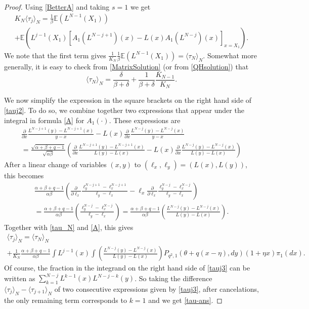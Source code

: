 \documentclass{amsart}
\theoremstyle{definition}
\theoremstyle{remark}
\theoremstyle{remark}
\theoremstyle{definition}
\numberwithin{equation}{section}
\begin{document}
\begin{proof}
Using \eqref{BetterA} and taking $s=1$ we get
\begin{multline}\label{tauj2}
  K_N\langle \tau_j\rangle_N =\frac{1}{\beta}{\mathds{E}} \left(L^{N-1}(X_1)\right) \\ +{\mathds{E}}\left(L^{j-1}(X_1)\left[A_1(L^{N-j+1})(x)-L(x)A_1(L^{N-j})(x)\right]_{x=X_1}\right).
\end{multline}
We note that the first term gives
$\tfrac{1}{K_N}\frac{1}{\beta}{\mathds{E}} \left(L^{N-1}(X_1)\right)={\langle}\tau_N{\rangle}_N$. Somewhat more generally, it is easy to check from \eqref{MatrixSolution} (or from \eqref{QHsolution}) that
\begin{equation}
  \label{tau_N}
   \langle \tau_N\rangle_N=\frac{\delta}{\beta+\delta}+\frac{1}{\beta+\delta}\frac{K_{N-1}}{K_N}.
\end{equation}

We now simplify the expression in the square brackets on the right hand side of \eqref{tauj2}. To do so, we  combine together  two expressions that appear  under the integral in  formula \eqref{A} for $A_1(\cdot)$. These expressions are
\begin{multline*}
\frac{\partial}{\partial x}\frac{L^{N-j+1}(y)-L^{N-j+1}(x)}{y-x}-L(x)\frac{\partial}{\partial x}\frac{L^{N-j}(y)-L^{N-j}(x)}{y-x}
\\
=\frac{\sqrt{\alpha+\beta+q-1}}{\sqrt{\alpha\beta}}
\left(\frac{\partial}{\partial x}\frac{L^{N-j+1}(y)-L^{N-j+1}(x)}{L(y)-L(x)}-
L(x)\frac{\partial}{\partial x}\frac{L^{N-j}(y)-L^{N-j}(x)}{L(y)-L(x)}\right)
\end{multline*}
After a linear change of variables $(x,y)$ to $(\ell_x,\ell_y)=(L(x),L(y))$, this becomes
\begin{multline*}
\frac{ \alpha+\beta+q-1}{ \alpha\beta}
\left(\frac{\partial}{\partial \ell_x}\frac{\ell_y^{N-j+1}-\ell_x^{N-j+1}}{\ell_y-\ell_x}-
\ell_x\frac{\partial}{\partial \ell_x}\frac{\ell_y^{N-j}-\ell_x^{N-j}}{\ell_y-\ell_x}\right) \\
=\frac{ \alpha+\beta+q-1}{ \alpha\beta}
\left(\frac{\ell_y^{N-j}-\ell_x^{N-j}}{\ell_y-\ell_x}\right)= \frac{ \alpha+\beta+q-1}{ \alpha\beta}
\left(\frac{L^{N-j}(y)-L^{N-j}(x)}{L(y)-L(x)}
\right).
\end{multline*}
Together with \eqref{tau_N} and \eqref{A}, this gives
\begin{multline}
  \label{tauj3}
   \langle \tau_j\rangle_N= \langle \tau_N\rangle_N \\ +
   \frac{1}{K_N}  \frac{ \alpha+\beta+q-1}{ \alpha\beta}\int L^{j-1}(x)\int \left(\frac{L^{N-j}(y)-L^{N-j}(x)}{L(y)-L(x)}
\right) P_{q^2,1}(\theta+q(x-\eta),dy) (1+\eta x)\pi_1(dx).
\end{multline}
Of course, the fraction in the integrand on the right hand side of \eqref{tauj3}
can be written as  $\sum_{k=1}^{N-j}L^{k-1}(x)L^{N-j-k}(y)$.
So taking the difference $\langle \tau_j\rangle_N -\langle \tau_{j+1}\rangle_N$  of two consecutive expressions given by \eqref{tauj3}, after cancelations,
the only remaining term corresponds to $k=1$ and we get
 \eqref{tau-ans}.
\end{proof}
\end{document}
